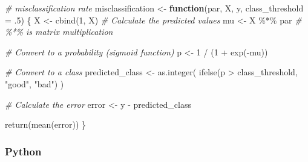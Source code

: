 \documentclass[
  letterpaper,
]{krantz}
\newenvironment{Shaded}{}{}
\newcommand{\AttributeTok}[1]{\textcolor[rgb]{0.49,0.56,0.16}{#1}}
\newcommand{\CommentTok}[1]{\textcolor[rgb]{0.38,0.63,0.69}{\textit{#1}}}
\newcommand{\ControlFlowTok}[1]{\textcolor[rgb]{0.00,0.44,0.13}{\textbf{#1}}}
\newcommand{\DecValTok}[1]{\textcolor[rgb]{0.25,0.63,0.44}{#1}}
\newcommand{\FunctionTok}[1]{\textcolor[rgb]{0.02,0.16,0.49}{#1}}
\newcommand{\NormalTok}[1]{#1}
\newcommand{\OtherTok}[1]{\textcolor[rgb]{0.00,0.44,0.13}{#1}}
\newcommand{\SpecialCharTok}[1]{\textcolor[rgb]{0.25,0.44,0.63}{#1}}
\newcommand{\StringTok}[1]{\textcolor[rgb]{0.25,0.44,0.63}{#1}}
\begin{document}
\begin{Shaded}
\begin{Highlighting}[]
\CommentTok{\# misclassification rate}
\NormalTok{misclassification }\OtherTok{\textless{}{-}} \ControlFlowTok{function}\NormalTok{(par, X, y, }\AttributeTok{class\_threshold =}\NormalTok{ .}\DecValTok{5}\NormalTok{) \{}
\NormalTok{    X }\OtherTok{\textless{}{-}} \FunctionTok{cbind}\NormalTok{(}\DecValTok{1}\NormalTok{, X)}
    \CommentTok{\# Calculate the predicted values}
\NormalTok{    mu }\OtherTok{\textless{}{-}}\NormalTok{ X }\SpecialCharTok{\%*\%}\NormalTok{ par }\CommentTok{\# \%*\% is matrix multiplication}

    \CommentTok{\# Convert to a probability (\textquotesingle{}sigmoid\textquotesingle{} function)}
\NormalTok{    p }\OtherTok{\textless{}{-}} \DecValTok{1} \SpecialCharTok{/}\NormalTok{ (}\DecValTok{1} \SpecialCharTok{+} \FunctionTok{exp}\NormalTok{(}\SpecialCharTok{{-}}\NormalTok{mu))}

    \CommentTok{\# Convert to a class}
\NormalTok{    predicted\_class }\OtherTok{\textless{}{-}} \FunctionTok{as.integer}\NormalTok{(}
        \FunctionTok{ifelse}\NormalTok{(p }\SpecialCharTok{\textgreater{}}\NormalTok{ class\_threshold, }\StringTok{"good"}\NormalTok{, }\StringTok{"bad"}\NormalTok{)}
\NormalTok{    )}

    \CommentTok{\# Calculate the error}
\NormalTok{    error }\OtherTok{\textless{}{-}}\NormalTok{ y }\SpecialCharTok{{-}}\NormalTok{ predicted\_class}

    \FunctionTok{return}\NormalTok{(}\FunctionTok{mean}\NormalTok{(error))}
\NormalTok{\}}
\end{Highlighting}
\end{Shaded}

\subsubsection{Python}
\end{document}
